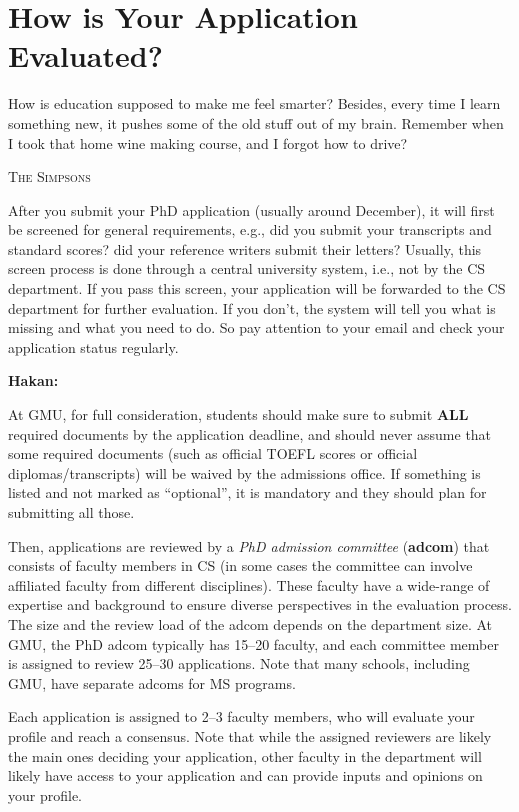 \documentclass[oneside,11pt]{memoir}
\newenvironment{commentbox}[1][]{
  \small
  \begin{mybox}
    {\small \textbf{#1}}
  }{
  \end{mybox}
}
\begin{document}
\chapter{How is Your Application Evaluated?}\label{sec:evalapps}

\epigraph{How is education supposed to make me feel smarter? Besides, every time I learn something new, it pushes some of the old stuff out of my brain. Remember when I took that home wine making course, and I forgot how to drive?}{\textsc{The Simpsons}}

After you submit your PhD application (usually around December), it will first be screened
for general requirements, e.g., did you submit your transcripts and standard scores? did your reference writers submit their letters? Usually, this screen process is done through a central university system, i.e., not by the CS department. If you pass this screen, your application will be forwarded to the CS department for further evaluation. If you don't,  the system will tell you what is missing and what you need to do. So pay attention to your email and check your application status regularly.

\begin{commentbox}[Hakan:]
  At GMU, for full consideration, students should make sure to submit \textbf{ALL} required documents by the application deadline, and should never assume that some required documents (such as official TOEFL scores or official diplomas/transcripts) will be waived by the admissions office. If something is listed and not marked as ``optional'', it is mandatory and they should plan for submitting all those.
\end{commentbox}

Then, applications are reviewed by a \emph{PhD admission committee} (\textbf{adcom}) that consists of faculty members in CS (in some cases the committee can involve affiliated faculty from different disciplines). These faculty have a wide-range of expertise and background to ensure diverse perspectives in the evaluation process. The size and the review load of the adcom depends on the department size. At GMU, the PhD adcom typically has 15--20 faculty, and each committee member is assigned to review 25--30 applications. Note that many schools, including GMU, have separate adcoms for MS programs.

Each application is assigned to 2--3 faculty members, who will evaluate your profile and reach a consensus.  Note that while the assigned reviewers are likely the main ones deciding your application, other faculty in the department will likely have access to your application and can provide inputs and opinions on your profile.
\end{document}

